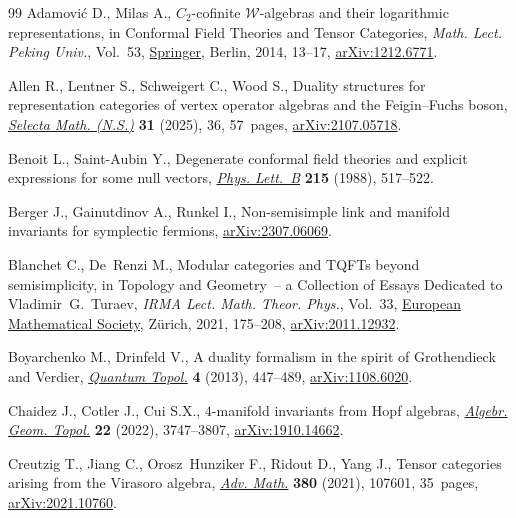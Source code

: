\documentclass[pdftex]{sigma}
\numberwithin{equation}{section}
\theoremstyle{definition}
\begin{document}
\begin{thebibliography}{99}
Adamovi\'c D., Milas A., $C_2$-cofinite $\mathcal{W}$-algebras and their
 logarithmic representations, in Conformal {F}ield {T}heories and {T}ensor
 {C}ategories, \textit{Math. Lect. Peking Univ.}, Vol.~53,
 \href{https://doi.org/10.1007/978-3-642-39383-9_6}{Springer}, Berlin, 2014,
 13--17, \href{http://arxiv.org/abs/1212.6771}{arXiv:1212.6771}.

Allen R., Lentner S., Schweigert C., Wood S., Duality structures for
 representation categories of vertex operator algebras and the
 {F}eigin--{F}uchs boson,
 \href{https://doi.org/10.1007/s00029-025-01032-x}{\textit{Selecta Math.
 (N.S.)}} \textbf{31} (2025), 36, 57~pages,
 \href{http://arxiv.org/abs/2107.05718}{arXiv:2107.05718}.

Benoit L., Saint-Aubin Y., Degenerate conformal field theories and explicit
 expressions for some null vectors,
 \href{https://doi.org/10.1016/0370-2693(88)91352-4}{\textit{Phys. Lett.~B}}
 \textbf{215} (1988), 517--522.

Berger J., Gainutdinov A., Runkel I., Non-semisimple link and manifold
 invariants for symplectic fermions,
 \href{http://arxiv.org/abs/2307.06069}{arXiv:2307.06069}.

Blanchet C., De~Renzi M., Modular categories and {TQFT}s beyond semisimplicity,
 in Topology and {G}eometry~-- a {C}ollection of {E}ssays {D}edicated to
 {V}ladimir~{G}.~{T}uraev, \textit{IRMA Lect. Math. Theor. Phys.}, Vol.~33,
 \href{https://doi.org/10.4171/IRMA/33-1/11}{European Mathematical Society},
 Z\"urich, 2021, 175--208,
 \href{http://arxiv.org/abs/2011.12932}{arXiv:2011.12932}.

Boyarchenko M., Drinfeld V., A duality formalism in the spirit of
 {G}rothendieck and {V}erdier,
 \href{https://doi.org/10.4171/QT/45}{\textit{Quantum Topol.}} \textbf{4}
 (2013), 447--489, \href{http://arxiv.org/abs/1108.6020}{arXiv:1108.6020}.

Chaidez J., Cotler J., Cui S.X., $4$-manifold invariants from {H}opf algebras,
 \href{https://doi.org/10.2140/agt.2022.22.3747}{\textit{Algebr. Geom.
 Topol.}} \textbf{22} (2022), 3747--3807,
 \href{http://arxiv.org/abs/1910.14662}{arXiv:1910.14662}.

Creutzig T., Jiang C., Orosz~Hunziker F., Ridout D., Yang J., Tensor categories
 arising from the {V}irasoro algebra,
 \href{https://doi.org/10.1016/j.aim.2021.107601}{\textit{Adv. Math.}}
 \textbf{380} (2021), 107601, 35~pages,
 \href{http://arxiv.org/abs/2021.10760}{arXiv:2021.10760}.


\end{thebibliography}
\end{document}
